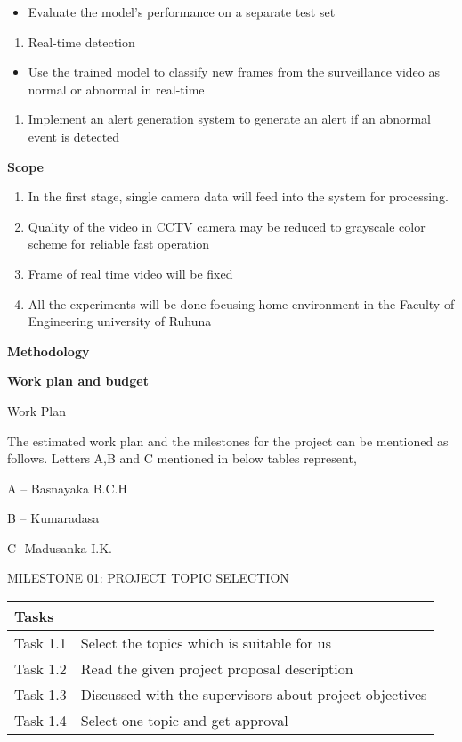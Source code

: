 \documentclass[
]{article}
\begin{document}
\begin{itemize}
\item
  Evaluate the model's performance on a separate test set
\end{itemize}

\begin{enumerate}
\def\labelenumi{\arabic{enumi}.}
\setcounter{enumi}{5}
\item
  Real-time detection
\end{enumerate}

\begin{itemize}
\item
  Use the trained model to classify new frames from the surveillance
  video as normal or abnormal in real-time
\end{itemize}

\begin{enumerate}
\def\labelenumi{\arabic{enumi}.}
\setcounter{enumi}{6}
\item
  Implement an alert generation system to generate an alert if an
  abnormal event is detected
\end{enumerate}

\textbf{Scope}

\begin{enumerate}
\def\labelenumi{\arabic{enumi}.}
\item
  In the first stage, single camera data will feed into the system for
  processing.
\item
  Quality of the video in CCTV camera may be reduced to grayscale color
  scheme for reliable fast operation
\item
  Frame of real time video will be fixed
\item
  All the experiments will be done focusing home environment in the
  Faculty of Engineering university of Ruhuna
\end{enumerate}

\textbf{Methodology}

\textbf{Work plan and budget}

Work Plan

The estimated work plan and the milestones for the project can be
mentioned as follows. Letters A,B and C mentioned in below tables
represent,

A -- Basnayaka B.C.H

B -- Kumaradasa

C- Madusanka I.K.

MILESTONE 01: PROJECT TOPIC SELECTION

\begin{longtable}[]{@{}ll@{}}
\toprule
Tasks &\tabularnewline
\midrule
\endhead
Task 1.1 & Select the topics which is suitable for us\tabularnewline
Task 1.2 & Read the given project proposal description\tabularnewline
Task 1.3 & Discussed with the supervisors about project
objectives\tabularnewline
Task 1.4 & Select one topic and get approval\tabularnewline
\bottomrule
\end{longtable}
\end{document}
